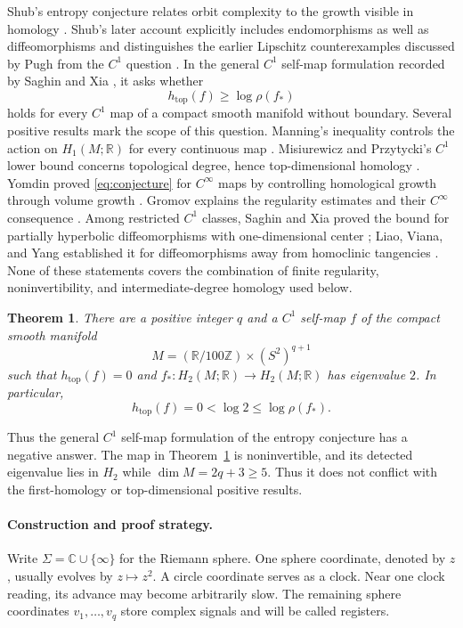 \documentclass[11pt]{article}
\newtheorem{theorem}{Theorem}[section]
\theoremstyle{definition}
\theoremstyle{remark}
\newcommand{\C}{\mathbb C}
\newcommand{\R}{\mathbb R}
\newcommand{\Z}{\mathbb Z}
\newcommand{\htop}{h_{\mathrm{top}}}
\begin{document}
Shub's entropy conjecture relates orbit complexity to the growth visible
in homology \cite{Shub1974}. Shub's later account explicitly includes
endomorphisms as well as diffeomorphisms and distinguishes the earlier
Lipschitz counterexamples discussed by Pugh from the \(C^1\) question
\cite[Section~2]{Shub2007}.
In the general \(C^1\) self-map formulation recorded by
Saghin and Xia \cite[Conjecture~1]{SaghinXia2010}, it asks whether
\begin{equation}\label{eq:conjecture}
 \htop(f)\ge \log\rho(f_*)
\end{equation}
holds for every \(C^1\) map of a compact smooth manifold without boundary.
Several positive results mark the scope of this question. Manning's
inequality controls the action on \(H_1(M;\R)\) for every continuous
map \cite{Manning1975,Manning1976}. Misiurewicz and Przytycki's
\(C^1\) lower bound concerns topological degree, hence top-dimensional
homology \cite{MisiurewiczPrzytycki1977,Manning1976}. Yomdin proved
\eqref{eq:conjecture} for \(C^\infty\) maps by controlling homological
growth through volume growth \cite{Yomdin1987}. Gromov explains the
regularity estimates and their \(C^\infty\) consequence
\cite[Sections~2.2--2.3]{Gromov1987}.
Among restricted \(C^1\) classes, Saghin and Xia proved the bound for
partially hyperbolic diffeomorphisms with one-dimensional center
\cite[Theorem~1]{SaghinXia2010}; Liao, Viana, and Yang established it
for diffeomorphisms away from homoclinic tangencies
\cite[Theorem~A]{LiaoVianaYang2013}.
None of these statements covers the combination of finite regularity,
noninvertibility, and intermediate-degree homology used below.

\begin{theorem}\label{thm:main}
There are a positive integer \(q\) and a \(C^1\) self-map \(f\) of the
compact smooth manifold
\[
 M=(\R/100\Z)\times(S^2)^{q+1}
\]
such that \(\htop(f)=0\) and \(f_*:H_2(M;\R)\to H_2(M;\R)\) has
eigenvalue \(2\). In particular,
\[
 \htop(f)=0<\log 2\le \log\rho(f_*).
\]
\end{theorem}

Thus the general \(C^1\) self-map formulation of the entropy conjecture
has a negative answer. The map in Theorem~\ref{thm:main} is noninvertible,
and its detected eigenvalue lies in \(H_2\) while
\(\dim M=2q+3\ge5\). Thus it does not conflict with the first-homology or
top-dimensional positive results.

\paragraph{Construction and proof strategy.}
Write \(\Sigma=\C\cup\{\infty\}\) for the Riemann sphere. One sphere
coordinate, denoted by \(z\), usually evolves by \(z\mapsto z^2\).
A circle coordinate serves as a clock. Near one clock reading, its
advance may become arbitrarily slow. The remaining sphere coordinates
\(v_1,\ldots,v_q\) store complex signals and will be called registers.
\end{document}
